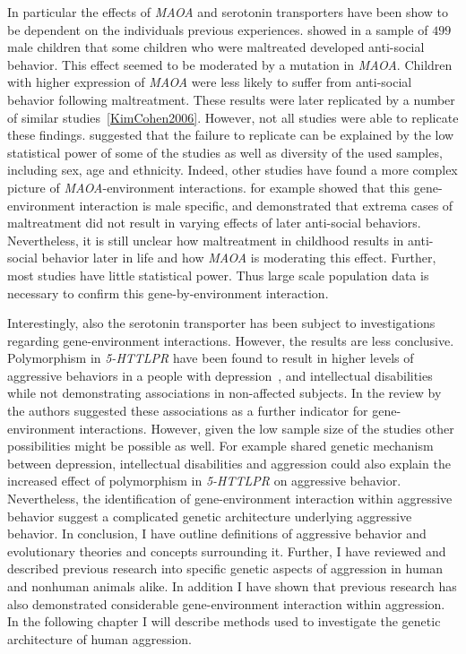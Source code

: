 In particular the effects of \textit{MAOA} and serotonin transporters have been show to be dependent on the individuals previous experiences.
\citet{Caspi2002} showed in a sample of $499$ male children that some children who were maltreated developed anti-social behavior.
This effect seemed to be moderated by a mutation in \textit{MAOA}.
Children with higher expression of \textit{MAOA} were less likely to suffer from anti-social behavior following maltreatment.
These results were later replicated by a number of similar studies~\ref{KimCohen2006}.
However, not all studies were able to replicate these findings.
\citet{Anholt2012} suggested that the failure to replicate can be explained by the low statistical power of some of the studies as well as diversity of the used samples, including sex, age and ethnicity.
Indeed, other studies have found a more complex picture of \textit{MAOA}-environment interactions.
\citet{Huang2004} for example showed that this gene-environment interaction is male specific, and \citet{Weder2009} demonstrated that extrema cases of maltreatment did not result in varying effects of later anti-social behaviors.
Nevertheless, it is still unclear how maltreatment in childhood results in anti-social behavior later in life and how \textit{MAOA} is moderating this effect.
Further, most studies have little statistical power.
Thus large scale population data is necessary to confirm this gene-by-environment interaction.

Interestingly, also the serotonin transporter has been subject to investigations regarding gene-environment interactions.
However, the results are less conclusive.
Polymorphism in \textit{5-HTTLPR} have been found to result in higher levels of aggressive behaviors in a people with depression~\cite{Gonda2011}, and intellectual disabilities~\cite{May2010} while not demonstrating associations in non-affected subjects.
In the review by~\citet{Anholt2012} the authors suggested these associations as a further indicator for gene-environment interactions.
However, given the low sample size of the studies other possibilities might be possible as well.
For example shared genetic mechanism between depression, intellectual disabilities and aggression could also explain the increased effect of polymorphism in \textit{5-HTTLPR} on aggressive behavior. 
Nevertheless, the identification of gene-environment interaction within aggressive behavior suggest a complicated genetic architecture underlying aggressive behavior.
\vfill
In conclusion, I have outline definitions of aggressive behavior and evolutionary theories and concepts surrounding it.
Further, I have reviewed and described previous research into specific genetic aspects of aggression in human and nonhuman animals alike.
In addition I have shown that previous research has also demonstrated considerable gene-environment interaction within aggression.
In the following chapter I will describe methods used to investigate the genetic architecture of human aggression.

